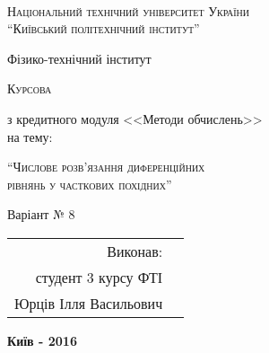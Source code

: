 \begin{titlepage}
\paragraph*{}
{\vspace{46pt}}
\begin{center}
\bfseries
{\scshape\Large Національний технічний університет України \\
``Київський політехнічний інститут''\par}
\vspace{12pt}
{\large Фізико-технічний інститут\\}
\vspace{48pt}
{\scshape\Large Курсова\\ \par}
з кредитного модуля <<Методи обчислень>>\\
на тему:\\
{\scshape\Large ``Числове розв’язання диференційних\\
рівнянь у часткових похідних''\\ \par}
Варіант № 8 \\
\end{center}

\vspace{165pt}
\begin{flushright}
\begin{tabular}{rl}
Виконав:\\
студент 3 курсу ФТІ\\
Юрців Ілля Васильович\\
\end{tabular}
\end{flushright}
\vfill
\begin{center}
\bfseries
Київ - 2016
\end{center}
\end{titlepage}
